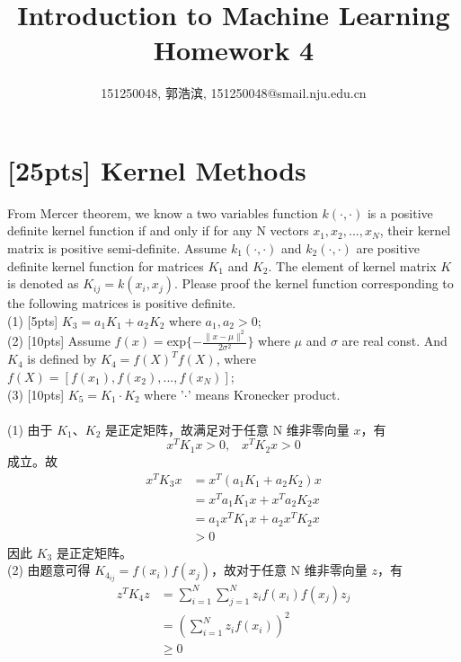 \documentclass{article}
\title{Introduction to Machine Learning\\Homework 4}
\author{151250048, 郭浩滨, 151250048@smail.nju.edu.cn}
\begin{document}
	\setlength{\baselineskip}{20pt}
	\maketitle
	
	
\section{[25pts] Kernel Methods}
	From Mercer theorem, we know a two variables function $k(\cdot,\cdot)$ is a positive definite kernel function if and only if for any N vectors $x_1,x_2,...,x_N$, their kernel matrix is positive semi-definite. Assume $k_1(\cdot,\cdot)$ and $k_2(\cdot,\cdot)$ are positive definite kernel function for matrices $K_1$ and $K_2$. The element of kernel matrix $K$ is denoted as $K_{ij}=k(x_i,x_j)$. Please proof the kernel function corresponding to the following matrices is positive definite.\\
    (1) [5pts] $K_3=a_1 K_1+a_2 K_2$ where $a_1,a_2>0$;\\
    (2) [10pts] Assume $f(x)=\text{exp}\{-\frac{\|x-\mu\|^2}{2\sigma^2}\}$ where $\mu$ and $\sigma$ are real const. And $K_4$ is defined by $K_4=f(X)^T f(X)$, where $f(X)=[f(x_1),f(x_2),...,f(x_N)]$;\\
    (3) [10pts] $K_5=K_1\cdot K_2$ where '$\cdot$' means Kronecker product.\\\\
	(1) 由于 $K_1$、$K_2$ 是正定矩阵，故满足对于任意 N 维非零向量 $x$，有
		\begin{equation*}
			x^TK_1x > 0\text{,}\quad x^TK_2x > 0
		\end{equation*}
		成立。故
		\begin{equation}
		\begin{aligned}
		x^TK_3x
		&= x^T(a_1K_1 + a_2K_2)x \\
		&= x^Ta_1K_1x + x^Ta_2K_2x \\
		&= a_1x^TK_1x + a_2x^TK_2x \\
		&> 0
		\end{aligned}
		\end{equation}
		因此 $K_3$ 是正定矩阵。\\
	(2) 由题意可得 $K_{4_{ij}} = f(x_i)f(x_j)$，故对于任意 N 维非零向量 $z$，有
		\begin{equation}
		\begin{aligned}
		z^TK_4z
		&= \sum_{i=1}^N \sum_{j=1}^N z_if(x_i)f(x_j)z_j \\
		&= \left( \sum_{i=1}^N z_if(x_i) \right)^2 \\
		&\geq 0
		\end{aligned}
		\end{equation}
\end{document}
